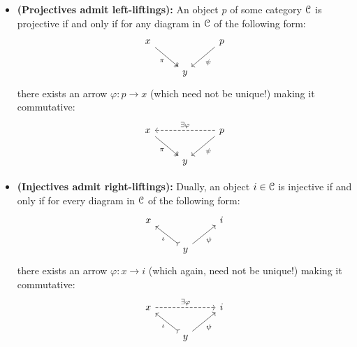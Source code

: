                 \begin{proposition} \label{prop: projectives_and_injectives_lifting_property}
                    \noindent
                    \begin{itemize}
                        \item\textbf{(Projectives admit left-liftings):} An object $p$ of some category $\mathcal{C}$ is projective if and only if for any diagram in $\mathcal{C}$ of the following form:
                            $$
                                \begin{tikzcd}
                                	x && p \\
                                	& y
                                	\arrow["\pi"', two heads, from=1-1, to=2-2]
                                	\arrow["\psi", from=1-3, to=2-2]
                                \end{tikzcd}
                            $$
                        there exists an arrow $\varphi: p \to x$ (which need not be unique!) making it commutative:
                            $$
                                \begin{tikzcd}
                                	x && p \\
                                	& y
                                	\arrow["\pi"', two heads, from=1-1, to=2-2]
                                	\arrow["\psi", from=1-3, to=2-2]
                                	\arrow["{\exists \varphi}"', dashed, from=1-3, to=1-1]
                                \end{tikzcd}
                            $$
                        \item \textbf{(Injectives admit right-liftings):} Dually, an object $i \in \mathcal{C}$ is injective if and only if for every diagram in $\mathcal{C}$ of the following form:
                            $$
                                \begin{tikzcd}
                                	x && i \\
                                	& y
                                	\arrow["\iota", tail, from=2-2, to=1-1]
                                	\arrow["\psi"', from=2-2, to=1-3]
                                \end{tikzcd}
                            $$
                        there exists an arrow $\varphi: x \to i$ (which again, need not be unique!) making it commutative:
                            $$
                                \begin{tikzcd}
                                	x && i \\
                                	& y
                                	\arrow["\iota", tail, from=2-2, to=1-1]
                                	\arrow["\psi"', from=2-2, to=1-3]
                                	\arrow["{\exists \varphi}", dashed, from=1-1, to=1-3]
                                \end{tikzcd}
                            $$
                    \end{itemize}
                \end{proposition}
